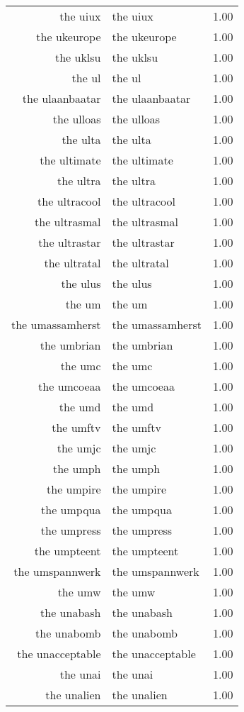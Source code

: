 \begin{table}[ht]
\begin{tabular}{rlr}
  the uiux & the uiux & 1.00 \\ 
  the ukeurope & the ukeurope & 1.00 \\ 
  the uklsu & the uklsu & 1.00 \\ 
  the ul & the ul & 1.00 \\ 
  the ulaanbaatar & the ulaanbaatar & 1.00 \\ 
  the ulloas & the ulloas & 1.00 \\ 
  the ulta & the ulta & 1.00 \\ 
  the ultimate & the ultimate & 1.00 \\ 
  the ultra & the ultra & 1.00 \\ 
  the ultracool & the ultracool & 1.00 \\ 
  the ultrasmal & the ultrasmal & 1.00 \\ 
  the ultrastar & the ultrastar & 1.00 \\ 
  the ultratal & the ultratal & 1.00 \\ 
  the ulus & the ulus & 1.00 \\ 
  the um & the um & 1.00 \\ 
  the umassamherst & the umassamherst & 1.00 \\ 
  the umbrian & the umbrian & 1.00 \\ 
  the umc & the umc & 1.00 \\ 
  the umcoeaa & the umcoeaa & 1.00 \\ 
  the umd & the umd & 1.00 \\ 
  the umftv & the umftv & 1.00 \\ 
  the umjc & the umjc & 1.00 \\ 
  the umph & the umph & 1.00 \\ 
  the umpire & the umpire & 1.00 \\ 
  the umpqua & the umpqua & 1.00 \\ 
  the umpress & the umpress & 1.00 \\ 
  the umpteent & the umpteent & 1.00 \\ 
  the umspannwerk & the umspannwerk & 1.00 \\ 
  the umw & the umw & 1.00 \\ 
  the unabash & the unabash & 1.00 \\ 
  the unabomb & the unabomb & 1.00 \\ 
  the unacceptable & the unacceptable & 1.00 \\ 
  the unai & the unai & 1.00 \\ 
  the unalien & the unalien & 1.00 \\ 

\end{tabular}
\end{table}

